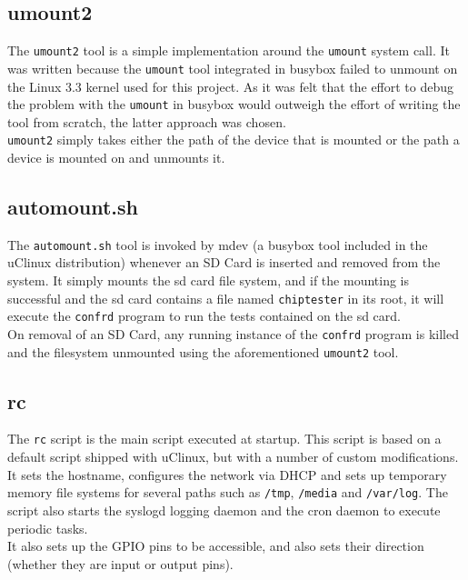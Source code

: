 \subsection{umount2}
The \texttt{umount2} tool is a simple implementation around the \texttt{umount} system call.
It was written because the \texttt{umount} tool integrated in busybox failed to unmount
on the Linux 3.3 kernel used for this project. As it was felt that the effort to debug
the problem with the \texttt{umount} in busybox would outweigh the effort of writing the tool
from scratch, the latter approach was chosen.
\\

\texttt{umount2} simply takes either the path of the device that is mounted or the path
a device is mounted on and unmounts it.


\subsection{automount.sh}
The \texttt{automount.sh} tool is invoked by mdev (a busybox tool included in the uClinux
distribution) whenever an SD Card is inserted and removed
from the system. It simply mounts the sd card file system, and if the mounting is
successful and the sd card contains a file named \texttt{chiptester} in its root, it
will execute the \texttt{confrd} program to run the tests contained on the sd card.
\\

On removal of an SD Card, any running instance of the \texttt{confrd} program is killed
and the filesystem unmounted using the aforementioned \texttt{umount2} tool.


\subsection{rc}
The \texttt{rc} script is the main script executed at startup. This script is based
on a default script shipped with uClinux, but with a number of custom modifications.
\\

It sets the hostname, configures the network via DHCP and sets up temporary memory file
systems for several paths such as \texttt{/tmp}, \texttt{/media} and \texttt{/var/log}. The
script also starts the syslogd logging daemon and the cron daemon to execute periodic tasks.
\\

It also sets up the GPIO pins to be accessible, and also sets their direction (whether
they are input or output pins).
\\

